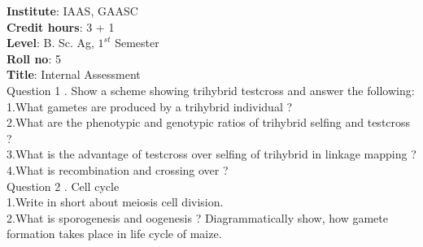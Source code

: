 \documentclass[12pt]{article}\usepackage[]{graphicx}\usepackage[]{color}
\begin{document}
{            \textbf{Institute}: IAAS, GAASC \\}\textbf{Credit hours}: 3 + 1 \\\textbf{Level}: B. Sc. Ag, $1^{st}$ Semester \\\textbf{Roll no}: 5 \\\textbf{Title}: Internal Assessment \\[1cm]Question 1 . Show a scheme showing trihybrid testcross and answer the following: \\\hspace{0.5cm}1.What gametes are produced by a trihybrid individual ?\\\hspace{0.5cm}2.What are the phenotypic and genotypic ratios of trihybrid selfing and testcross ?\\\hspace{0.5cm}3.What is the advantage of testcross over selfing of trihybrid in linkage mapping ?\\\hspace{0.5cm}4.What is recombination and crossing over ?\\Question 2 . Cell cycle \\\hspace{0.5cm}1.Write in short about meiosis cell division.\\\hspace{0.5cm}2.What is sporogenesis and oogenesis ? Diagrammatically show, how gamete formation takes place in life cycle of maize.\\
\end{document}
